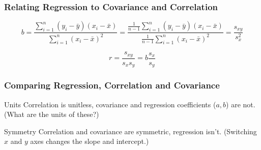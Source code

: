 \documentclass[handout]{beamer}
\begin{document}
\begin{frame}
	\frametitle{Relating Regression to Covariance and Correlation}
		$$b = \frac{\sum_{i=1}^n \left(y_i - \bar{y}\right)\left(x_i - \bar{x} \right)}{\sum_{i=1}^n \left(x_i - \bar{x}\right)^2} = \frac{\frac{1}{n-1}\sum_{i=1}^n \left(y_i - \bar{y}\right)\left(x_i - \bar{x} \right)}{\frac{1}{n-1}\sum_{i=1}^n \left(x_i - \bar{x}\right)^2} = \frac{s_{xy}}{s_x^2}$$
		
		$$r = \frac{s_{xy}}{s_x s_y} = b \frac{s_x}{s_y}$$
		
\end{frame}
\begin{frame}
\frametitle{Comparing Regression, Correlation and Covariance}

\begin{block}{Units}
Correlation is unitless, covariance and regression coefficients ($a, b$) are not. (What are the units of these?)
\end{block}


\begin{block}{Symmetry}
Correlation and covariance are symmetric, regression isn't. (Switching $x$ and $y$ axes changes the slope and intercept.)
\end{block}


\end{frame}
\end{document}
